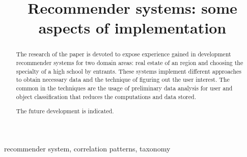 \documentclass[conference]{IEEEtran}
\begin{document}

\title{Recommender systems: some aspects of implementation}

\author{%
}

\maketitle

\begin{abstract}
  The research of the paper is devoted to expose experience gained in development recommender systems for two domain areas: real estate of an region and choosing the specialty of a high school by entrants. These systems implement different approaches to obtain necessary data and the technique of figuring out the user interest. The common in the techniques are the usage of preliminary data analysis for user and object classification that reduces the computations and data stored. %

The future development is indicated.

\end{abstract}

\begin{IEEEkeywords}
recommender system, correlation patterns, taxonomy
\end{IEEEkeywords}
\end{document}
